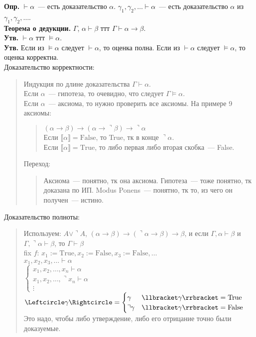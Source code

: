 \documentclass{article}
\begin{document}
	\textbf{Опр.} $\vdash \alpha$~--- есть доказательство $\alpha$. $\gamma_1, \gamma_2, \dots \vdash \alpha$~--- есть доказательство $\alpha$ из $\gamma_1, \gamma_2, \dots$. \\
	\textbf{Теорема о дедукции.} $\Gamma$, $\alpha \vdash \beta$ ттт $\Gamma \vdash \alpha \rightarrow \beta$. \\
	\textbf{Утв.} $\vdash \alpha$ ттт $\vDash \alpha$. \\
	\textbf{Утв.} Если из $\vDash \alpha$ следует $\vdash \alpha$, то оценка полна. Если из $\vdash \alpha$ следует $\vDash \alpha$, то оценка корректна. \\
	Доказательство корректности:
	\begin{quote}
		Индукция по длине доказательства $\Gamma \vdash \alpha$. \\
		Если $\alpha$~--- гипотеза, то очевидно, что следует $\Gamma \vDash \alpha$. \\
		Если $\alpha$~--- аксиома, то нужно проверить все аксиомы. На примере 9 аксиомы:
		\begin{quote}
			$(\alpha \rightarrow \beta) \rightarrow (\alpha \rightarrow \urcorner \beta) \rightarrow \urcorner \alpha$ \\
			Если $\llbracket \alpha \rrbracket = \text{False}$, то True, тк в конце $\urcorner \alpha$. \\
			Если $\llbracket \alpha \rrbracket = \text{True}$, то либо первая либо вторая скобка~--- False.
		\end{quote}
		Переход:
		\begin{quote}
			Аксиома~--- понятно, тк она аксиома. Гипотеза~--- тоже понятно, тк доказана по ИП. Modus Ponens~--- понятно, тк то, из чего он получен~--- истино.
		\end{quote}
	\end{quote}
	Доказательство полноты:
	\begin{quote}
		Используем: $A \vee \urcorner A$, $(\alpha \rightarrow \beta) \rightarrow (\urcorner \alpha \rightarrow \beta) \rightarrow \beta$, и если $\Gamma, \alpha \vdash \beta$ и $\Gamma, \urcorner \alpha \vdash \beta$, то $\Gamma \vdash \beta$ \\
		fix $f$: $x_1 := \text{True}, x_2 := \text{False}, x_3 := \text{False}, \dots$ \\
		$x_1, x_2, x_3, \dots \vdash \alpha$ \\
		$\begin{cases}
			x_1, x_2, \dots, x_n \vdash \alpha \\
			x_1, x_2, \dots, \urcorner x_n \vdash \alpha \\
			\vdots
		\end{cases}$ \\
		$\Leftcircle \gamma \Rightcircle =
		\begin{cases}
			\gamma & \llbracket \gamma \rrbracket = \text{True} \\
			\urcorner \gamma & \llbracket \gamma \rrbracket = \text{False}
		\end{cases}
		$ Это надо, чтобы либо утверждение, либо его отрицание точно были доказуемые. \\
	\end{quote}
\end{document}
